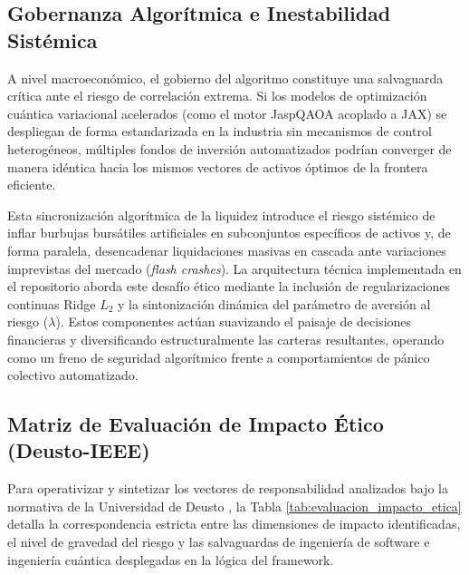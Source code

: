 \subsection{Gobernanza Algorítmica e Inestabilidad Sistémica}
A nivel macroeconómico, el gobierno del algoritmo constituye una salvaguarda crítica ante el riesgo de correlación extrema. Si los modelos de optimización cuántica variacional acelerados (como el motor JaspQAOA acoplado a JAX) se despliegan de forma estandarizada en la industria sin mecanismos de control heterogéneos, múltiples fondos de inversión automatizados podrían converger de manera idéntica hacia los mismos vectores de activos óptimos de la frontera eficiente. 

Esta sincronización algorítmica de la liquidez introduce el riesgo sistémico de inflar burbujas bursátiles artificiales en subconjuntos específicos de activos y, de forma paralela, desencadenar liquidaciones masivas en cascada ante variaciones imprevistas del mercado (\textit{flash crashes}). La arquitectura técnica implementada en el repositorio aborda este desafío ético mediante la inclusión de regularizaciones continuas Ridge $L_2$ y la sintonización dinámica del parámetro de aversión al riesgo ($\lambda$). Estos componentes actúan suavizando el paisaje de decisiones financieras y diversificando estructuralmente las carteras resultantes, operando como un freno de seguridad algorítmico frente a comportamientos de pánico colectivo automatizado.

\subsection{Matriz de Evaluación de Impacto Ético (Deusto-IEEE)}
Para operativizar y sintetizar los vectores de responsabilidad analizados bajo la normativa de la Universidad de Deusto \cite{DeustoEthics2024}, la Tabla \ref{tab:evaluacion_impacto_etica} detalla la correspondencia estricta entre las dimensiones de impacto identificadas, el nivel de gravedad del riesgo y las salvaguardas de ingeniería de software e ingeniería cuántica desplegadas en la lógica del framework.

